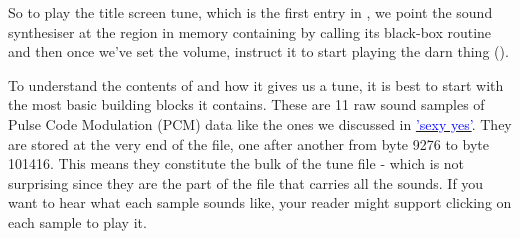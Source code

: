 So to play the title screen tune, which is the first entry in , we point
the sound synthesiser at the region in memory containing  by calling
its black-box routine  and then once we've set the volume, instruct
it to start playing the darn thing ().

To understand the contents of  and how it gives us a tune, it is best to
start with the most basic building blocks it contains. These are 11 raw sound samples of
Pulse Code Modulation (PCM) data like the ones we discussed in 
\hyperref[sec:sexy_yes]{\textcolor{blue}{'sexy yes'}}.
They are stored at the very end of the file, one after another from
byte 9276 to byte 101416. This means they constitute the bulk of the  tune file - which
is not surprising since they are the part of the file that carries all the sounds. If you want to hear
what each sample sounds like, your reader might support clicking on each sample to play it.

